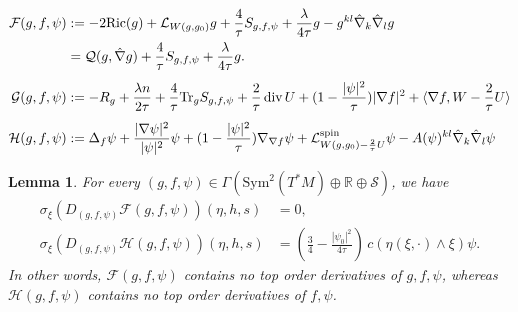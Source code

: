 \documentclass{amsart}
\newtheorem{lemma}[theorem]{Lemma}
\theoremstyle{definition}
\theoremstyle{remark}
\numberwithin{equation}{section}
\newcommand{\Ric}{\textup{Ric}}
\newcommand{\Tr}{\textup{Tr}}
\newcommand{\R}{\mathbb{R}}
\renewcommand{\div}{\,\textup{div}}
\begin{document}
	\begin{equation}\label{def:lower_order_terms}
		\begin{aligned}
			\mathcal{F}(g,f,\psi) &:= -2\Ric(g) + \mathcal{L}_{W(g,g_0)}g   + \frac{4}{\tau}S_{g,f,\psi} + \frac{\lambda}{4\tau}g -  g^{kl}\hat{\nabla}_k\hat{\nabla}_l g\\
			&= \mathcal{Q}(g, \hat{\nabla} g) + \frac{4}{\tau}S_{g,f,\psi} + \frac{\lambda}{4\tau}g.\\[1ex]
			\mathcal{G}(g,f,\psi) &:= - R_g + \frac{\lambda n}{2\tau} +\frac{4}{\tau} \Tr_g S_{g,f,\psi} + \frac{2}{\tau}\div\, U + (1-\frac{|\psi|^2}{\tau})|\nabla f|^2 + \langle \nabla f, W - \frac{2}{\tau}U\rangle \\[1ex]
			\mathcal{H}(g,f,\psi) &:= \Delta_f \psi +\frac{|\nabla\psi|^2}{|\psi|^2}\psi  +(1-\frac{|\psi|^2}{\tau})\nabla_{\nabla f}\psi + \mathcal{L}_{W(g,g_0)- \frac{2}{\tau}U}^{\text{spin}}\psi -  A(\psi)^{kl}\hat{\nabla}_k\hat{\nabla}_l\psi
		\end{aligned}
	\end{equation}
	
\medskip
\begin{lemma}\label{lem:lower_order_terms}
	For every $(g,f,\psi)\in\Gamma(\text{Sym}^2(T^*M)\oplus\R \oplus\mathcal{S})$, we have
	\begin{equation}
		\begin{aligned}
			\sigma_{\xi}(D_{(g,f,\psi)}\mathcal{F}(g,f,\psi))(\eta,h,  s) &= 0,\\[1ex]
			\sigma_{\xi}(D_{(g,f,\psi)}\mathcal{H}(g,f,\psi))(\eta,h, s) &=  \left(\frac{3}{4}  - \frac{|\psi_0|^2}{4\tau}\right)\, c(\eta(\xi,\cdot)\wedge\xi) \psi.
		\end{aligned}
	\end{equation}
	In other words, $\mathcal{F}(g,f,\psi)$ contains no top order derivatives of $g,f,\psi$, whereas $\mathcal{H}(g,f,\psi)$ contains no top order derivatives of $f,\psi$.
\end{lemma}
\end{document}
